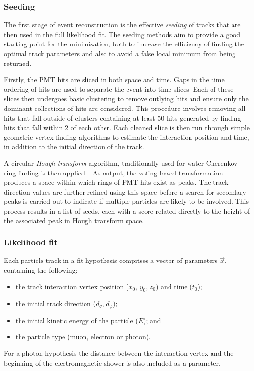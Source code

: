 \subsubsection*{Seeding} %

The first stage of event reconstruction is the effective \emph{seeding} of tracks that are then
used in the full likelihood fit. The seeding methods aim to provide a good starting point for the
minimisation, both to increase the efficiency of finding the optimal track parameters and also to
avoid a false local minimum from being returned.

Firstly, the PMT hits are sliced in both space and time. Gaps in the time ordering of hits are
used to separate the event into time slices. Each of these slices then undergoes basic clustering
to remove outlying hits and ensure only the dominant collections of hits are considered. This
procedure involves removing all hits that fall outside of clusters containing at least 50 hits
generated by finding hits that fall within \SI{2}{} of each other. Each cleaned slice is
then run through simple geometric vertex finding algorithms to estimate the interaction position
and time, in addition to the initial direction of the track.

A circular \emph{Hough transform} algorithm, traditionally used for water Cherenkov ring finding
is then applied~\cite{illingworth1988}. As output, the voting-based transformation produces a
space within which rings of PMT hits exist as peaks. The track direction values are further
refined using this space before a search for secondary peaks is carried out to indicate if
multiple particles are likely to be involved. This process results in a list of seeds, each with a
score related directly to the height of the associated peak in Hough transform space.

\subsubsection*{Likelihood fit} %


Each particle track in a fit hypothesis comprises a vector of parameters $\vec{x}$, containing the
following:
\begin{itemize}
    \item the track interaction vertex position ($x_{0}$, $y_{0}$, $z_{0}$) and time ($t_{0}$);
    \item the initial track direction ($d_{\theta}$, $d_{\phi}$);
    \item the initial kinetic energy of the particle ($E$); and
    \item the particle type (muon, electron or photon).
\end{itemize}
For a photon hypothesis the distance between the interaction vertex and the beginning of the
electromagnetic shower is also included as a parameter.

